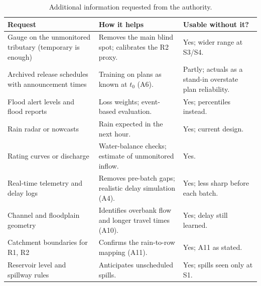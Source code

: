\begin{table}[H]\centering\small
\caption{Additional information requested from the authority.}
\label{tab:q1requests}
\begin{tabularx}{\linewidth}{@{}>{\raggedright\arraybackslash}p{3.4cm}LL@{}}
\toprule
Request & How it helps & Usable without it?\\
\midrule
Gauge on the unmonitored tributary (temporary is enough) & Removes the main blind spot; calibrates the R2 proxy. & Yes; wider range at S3/S4.\\
Archived release schedules with announcement times & Training on plans as known at $t_0$ (A6). & Partly; actuals as a stand-in overstate plan reliability.\\
Flood alert levels and flood reports & Loss weights; event-based evaluation. & Yes; percentiles instead.\\
Rain radar or nowcasts & Rain expected in the next hour. & Yes; current design.\\
Rating curves or discharge & Water-balance checks; estimate of unmonitored inflow. & Yes.\\
Real-time telemetry and delay logs & Removes pre-batch gaps; realistic delay simulation (A4). & Yes; less sharp before each batch.\\
Channel and floodplain geometry & Identifies overbank flow and longer travel times (A10). & Yes; delay still learned.\\
Catchment boundaries for R1, R2 & Confirms the rain-to-row mapping (A11). & Yes; A11 as stated.\\
Reservoir level and spillway rules & Anticipates unscheduled spills. & Yes; spills seen only at S1.\\
\bottomrule
\end{tabularx}
\end{table}

